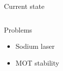 \documentclass{beamer}
\begin{document}
\begin{frame}{Current state}
\begin{columns}[t]
\begin{center}
{
      }
       {
        \begin{block}{Problems}
          \begin{itemize}
          \item<9-> Sodium laser
          \item<10-> MOT stability
          \end{itemize}
        \end{block}
      }
    \end{center}
  \end{columns}
\end{frame}




\end{document}
